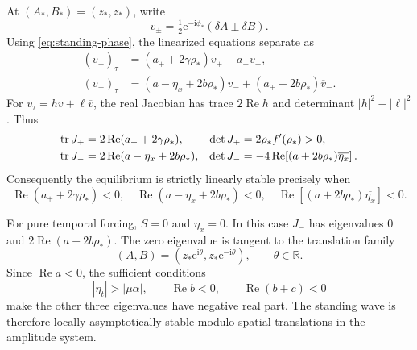\documentclass[11pt]{article}
\newcommand{\ii}{\mathrm{i}}
\newcommand{\ee}{\mathrm{e}}
\newcommand{\cD}{\mathcal{D}}
\DeclareMathOperator{\RePart}{Re}
\begin{document}
At $(A_*,B_*)=(z_*,z_*)$, write
\begin{equation}
 v_\pm=\tfrac12\ee^{-\ii\phi_*}(\delta A\pm\delta B).
\end{equation}
Using \eqref{eq:standing-phase}, the linearized equations separate as
\begin{align}
 (v_+)_\tau&=(a_++2\gamma\rho_*)v_+-a_+\overline v_+,
 \label{eq:standing-symmetric-linearization}\\
 (v_-)_\tau&=(a-\eta_x+2b\rho_*)v_-
                +(a_++2b\rho_*)\overline v_-.
 \label{eq:standing-antisymmetric-linearization}
\end{align}
For $v_\tau=hv+\ell\overline v$, the real Jacobian has trace
$2\RePart h$ and determinant $|h|^2-|\ell|^2$. Thus
\begin{align}
 \tr J_+&=2\RePart(a_++2\gamma\rho_*),
 &\det J_+&=2\rho_*f'(\rho_*)>0,\notag\\
 \tr J_-&=2\RePart(a-\eta_x+2b\rho_*),
 &\det J_-&=-4\RePart\!\left[(a+2b\rho_*)\overline{\eta_x}\right].
 \label{eq:standing-stability-blocks}
\end{align}
Consequently the equilibrium is strictly linearly stable precisely when
\begin{equation}
 \RePart(a_++2\gamma\rho_*)<0,\quad
 \RePart(a-\eta_x+2b\rho_*)<0,\quad
 \RePart\!\left[(a+2b\rho_*)\overline{\eta_x}\right]<0.
 \label{eq:standing-stability-conditions}
\end{equation}

For pure temporal forcing, $S=0$ and $\eta_x=0$. In this case $J_-$ has
eigenvalues $0$ and $2\RePart(a+2b\rho_*)$. The zero eigenvalue is tangent
to the translation family
\begin{equation}
 (A,B)=(z_*\ee^{\ii\theta},z_*\ee^{-\ii\theta}),
 \qquad \theta\in\mathbb R.
\end{equation}
Since $\RePart a<0$, the sufficient conditions
\begin{equation}
 \boxed{|\eta_t|>|\mu\alpha|,\qquad
 \RePart b<0,\qquad \RePart(b+c)<0}
 \label{eq:stable-temporal-pattern}
\end{equation}
make the other three eigenvalues have negative real part. The standing wave
is therefore locally asymptotically stable modulo spatial translations in
the amplitude system.

\end{document}
